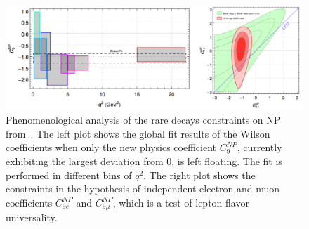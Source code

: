 \begin{figure}[!htb]
\begin{center}
\includegraphics[width=15cm]{rare_fit.pdf}
\end{center}
\caption{Phenomenological analysis of the rare decays constraints on NP from~\cite{Descotes-Genon:2016hem}. The left plot shows the global fit results of the Wilson coefficients when only the new physics coefficient $C_9^{NP}$, currently exhibiting the largest deviation from 0,  is left floating. The fit is performed in  different bins of $q^2$. The right plot shows the constraints in the hypothesis of independent electron and muon coefficients $C_{9e}^{NP}$ and  $C_{9\mu}^{NP}$, which is a test of lepton flavor universality.}%
\label{figrare}%
\end{figure}




